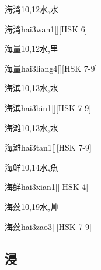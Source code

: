 \begin{Entry}{海湾}{10,12}{⽔,⽔}
  \begin{Phonetics}{海湾}{hai3wan1}[][HSK 6]
  \end{Phonetics}
\end{Entry}

\begin{Entry}{海量}{10,12}{⽔,⾥}
  \begin{Phonetics}{海量}{hai3liang4}[][HSK 7-9]
  \end{Phonetics}
\end{Entry}

\begin{Entry}{海滨}{10,13}{⽔,⽔}
  \begin{Phonetics}{海滨}{hai3bin1}[][HSK 7-9]
  \end{Phonetics}
\end{Entry}

\begin{Entry}{海滩}{10,13}{⽔,⽔}
  \begin{Phonetics}{海滩}{hai3tan1}[][HSK 7-9]
  \end{Phonetics}
\end{Entry}

\begin{Entry}{海鲜}{10,14}{⽔,⿂}
  \begin{Phonetics}{海鲜}{hai3xian1}[][HSK 4]
  \end{Phonetics}
\end{Entry}

\begin{Entry}{海藻}{10,19}{⽔,⾋}
  \begin{Phonetics}{海藻}{hai3zao3}[][HSK 7-9]
  \end{Phonetics}
\end{Entry}

\subsection*{浸}

